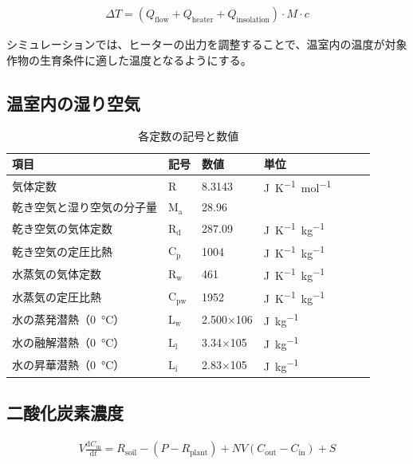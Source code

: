 \documentclass[uplatex,dvipdfmx,nomag,a4paper,oneside,onecolumn,12pt]{bxjsreport} %
\begin{document}
\begin{align}
    \Delta T = (Q_\text{flow} + Q_\text{heater} + Q_\text{insolation}) \cdot M \cdot c
    \label{DeltaT}
\end{align}

シミュレーションでは、ヒーターの出力を調整することで、温室内の温度が対象作物の生育条件に適した温度となるようにする。

\subsection{温室内の湿り空気}
\begin{table}[ht]
    \caption{各定数の記号と数値}
    \label{tab:constant}
    \centering
    \begin{tabular}{llllrrc}
        \toprule %
        項目 & 記号 & 数値 & 単位\\
        \midrule %
        気体定数 & \(\mathrm{R}\) & 8.3143 & \si{J.K^{-1}.mol^{-1}} \\
        乾き空気と湿り空気の分子量 & \(\mathrm{M_a}\) & 28.96 & \\
        乾き空気の気体定数 & \(\mathrm{R_d}\) & 287.09 & \si{J.K^{-1}.kg^{-1}} \\
        乾き空気の定圧比熱 & \(\mathrm{C_p}\) & 1004 & \si{J.K^{-1}.kg^{-1}} \\
        水蒸気の気体定数 & \(\mathrm{R_w}\) & 461 & \si{J.K^{-1}.kg^{-1}} \\
        水蒸気の定圧比熱 & \(\mathrm{C_{pw}}\) & 1952 & \si{J.K^{-1}.kg^{-1}} \\
        水の蒸発潜熱（\SI{0}{\degreeCelsius}） & \(\mathrm{L_w}\) & 2.500\(\times\)106 & \si{J.kg^{-1}}\\
        水の融解潜熱（\SI{0}{\degreeCelsius}） & \(\mathrm{L_l}\) & 3.34\(\times\)105 &  \si{J.kg^{-1}}\\
        水の昇華潜熱（\SI{0}{\degreeCelsius}） & \(\mathrm{L_i}\) & 2.83\(\times\)105 & \si{J.kg^{-1}}\\
        \bottomrule %
    \end{tabular}
\end{table}

\subsection{二酸化炭素濃度}
\begin{align}
    V\frac{\mathrm{d}C_{\mathrm{in}}}{\mathrm{d}t} = R_\mathrm{soil} - (P - R_\mathrm{plant}) + N V (C_\mathrm{out} - C_\mathrm{in}) + S
    \label{eq:co2flow}
\end{align}
\end{document}
